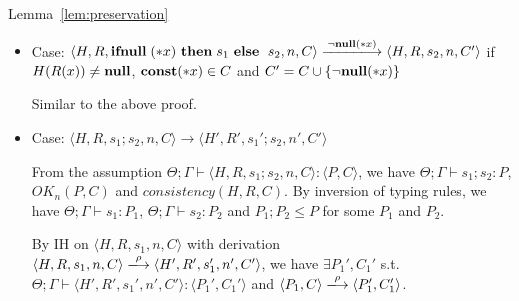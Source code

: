 \begin{pfof}{Lemma~\ref{lem:preservation}}
\begin{itemize}
  From assumption \( \Theta; \Gamma \vdash \langle H, R, \IFNULL\Sirx
  \ \THEN s_{1} \ \ELSE \ s_{2}, n, C \rangle : \langle P, C
  \rangle\), we have \(\Theta; \Gamma \vdash \IFNULL\Sirx \ \THEN
  s_{1} \ \ELSE \ s_{2} \COL P \), \(OK_n(P, C)\) and \(consistency(H,
  R, C)\). From the inversion of typing rules, we have \(\Theta;
  \Gamma \vdash s_{1} \COL P_1\), \(\Theta; \Gamma \vdash s_{2} \COL
  P_2\) and \((*x)(P_1, P_2) \le P\). According to rule
  Tr-NNullNotIn1, \(\scon\Sirx \in C\) and \(C' = C \cup \snull\), we
  have \(\langle (*x)(P_1, P_2) \rangle \xlongrightarrow{\snull}
  \langle P_1, C \cup \snull \rangle \), and then by the definition of
  subtyping, we get \(\langle P, C \rangle \xLongrightarrow{\snull}
  \langle Q, C\cup \{\snull\} \rangle \) and \(P_1 \le Q\) for some
  \(Q\).
  
  We need to find \(P'\) and \(C'\) such that \(\Theta;\Gamma \vdash
  s_1 \COL P'\), \( \langle P, C \rangle \xLongrightarrow{\snull}
  \langle P', C' \rangle\), \(\OK_n(P', C'\)) and \(consistency(H, R,
  C')\). Take \(Q\) as \(P'\) and \(C\cup \{\snull\}\) as \(C'\). Then
  \( \langle P,C \rangle \xlongrightarrow{\snull} \langle P', c'
  \rangle\) holds, and then \(\OK_n(P', C')\) and \(consistency(H, R,
  C')\)hold by Lemma~\ref{lem:okPreserved} and
  Lemma~\ref{lem:consistency}.  We also have \(\Theta; \Gamma \vdash
  s_1 \COL P'\) from , \(\Theta; \Gamma \vdash s_1 \COL
  P_1\) and \( P_1 \le Q\).

\item Case: \(\langle H, R, \IFNULL \Sirx \ \THEN s_{1} \ \ELSE
    \ s_{2}, n, C\rangle \xlongrightarrow{\snnull} \langle H, R, s_{2}, n, C'
    \rangle\) if \(H(R(x)) \neq \mathbf{null}\), \(\scon\Sirx \in C\) and \(C'
    = C \cup \{\neg{\bf null}(*x)\}\)

  Similar to the above proof.

\item Case: \(\langle H, R, s_1;s_2, n, C\rangle \rightarrow \langle
  H', R', s_1';s_2, n', C' \rangle \)

  From the assumption \(\Theta; \Gamma \vdash \langle H, R, s_1;s_2,
  n, C \rangle : \langle P, C \rangle\), we have \(\Theta; \Gamma
  \vdash s_1;s_2 : P\), \(OK_n(P, C)\) and \(consistency(H, R,
  C)\). By inversion of typing rules, we have \(\Theta; \Gamma \vdash
  s_1: P_1\), \(\Theta; \Gamma \vdash s_2: P_2\) and \(P_1;P_2 \le P\)
  for some \(P_1\) and \(P_2\).

  By IH on \( \langle H, R, s_1, n, C \rangle \) with derivation \(
  \langle H, R, s_1, n, C \rangle \xlongrightarrow{\rho} \langle H',
  R', s_1', n', C' \rangle\), we have \(\exists P_1',C_1'\)
  s.t. \(\Theta; \Gamma \vdash \langle H', R', s_1', n', C' \rangle :
  \langle P_1', C_1' \rangle\) and \( \langle P_1, C \rangle
  \xlongrightarrow{\rho} \langle P_1', C_1' \rangle\).


\end{itemize}
\end{pfof}

